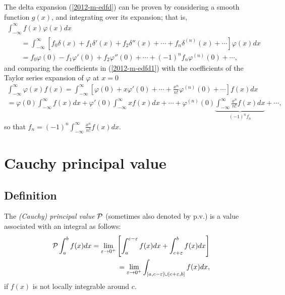 {\color{OliveGreen}
\bproof
The delta expansion (\ref{2012-m-edfd}) can be proven by considering a smooth function $g(x)$, and integrating over its expansion; that is,
\begin{equation}
\begin{split}
 \int_{-\infty}^\infty  f(x) \varphi (x) dx  \\
\qquad =
 \int_{-\infty}^\infty   \left[
f_0 \delta (x) +
f_1 \delta' (x) +
f_2 \delta'' (x)
+ \cdots  +
f_n \delta^{(n)}(x)
+ \cdots \right]\varphi (x)  dx \\
\qquad =
f_0  \varphi (0) - f_1  \varphi' (0) + f_2  \varphi'' (0) +\cdots  + (-1)^n  f_n  \varphi^{(n)}(0)
+ \cdots
,
\end{split}
\label{2012-m-edfd1}
\end{equation}
and comparing the coefficients in (\ref{2012-m-edfd1})
with the coefficients  of  the Taylor series expansion of $\varphi$ at $x=0$
\begin{equation}
\begin{split}
 \int_{-\infty}^\infty  \varphi (x) f(x)  =
 \int_{-\infty}^\infty  \left[
 \varphi (0) +x  \varphi' (0) + \cdots + \frac{x^n}{n!} \varphi^{(n)} (0)  + \cdots
 \right] f(x) dx \\
 =
 \varphi (0) \int_{-\infty}^\infty  f(x) dx  +
\varphi' (0) \int_{-\infty}^\infty x f(x) dx   + \cdots +  \varphi^{(n)} (0)\underbrace{\int_{-\infty}^\infty \frac{x^n}{n!} f(x) dx}_{(-1)^n f_n}  + \cdots
,
\end{split}
\label{2012-m-edfd2tse1}
\end{equation}
so that
$f_n =  (-1)^n  \int_{-\infty}^\infty \frac{x^n}{n!} f(x) dx$.
\eproof
}



\section{Cauchy principal value}

\subsection{Definition}


The {\em  (Cauchy) principal value} ${\cal P}$ (sometimes also denoted by $\textrm{p.v.}$)
is a value associated with an integral as follows:
\begin{equation}
\begin{split}
{\cal P}
\int_{a}^b f(x) dx
= \lim_{\varepsilon \rightarrow 0^+}
\left[
\int_{a}^{c-\varepsilon} f(x) dx
+
\int_{c+\varepsilon}^{b} f(x) dx
\right]
\\
\qquad
=  \lim_{\varepsilon \rightarrow 0^+}
\int_{[a,c-\varepsilon] \cup [c+\varepsilon,b]}   f(x) dx
,
\end{split}
\end{equation}
if  $f(x)$ is not locally integrable around $c$.


